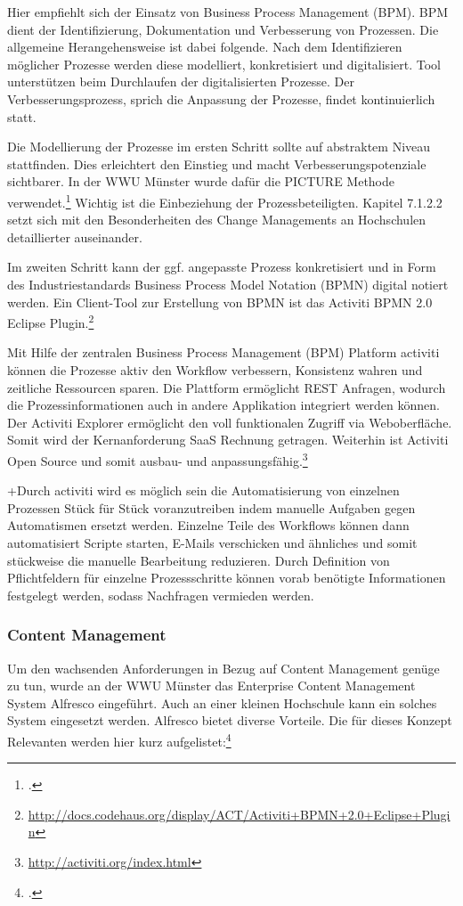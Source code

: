 {Hier empfiehlt sich der Einsatz von Business Process Management (BPM). BPM dient der Identifizierung, Dokumentation und Verbesserung von Prozessen. Die allgemeine Herangehensweise ist dabei folgende. Nach dem Identifizieren möglicher Prozesse werden diese modelliert, konkretisiert und digitalisiert. Tool unterstützen beim Durchlaufen der digitalisierten Prozesse. Der Verbesserungsprozess, sprich die Anpassung der Prozesse, findet kontinuierlich statt.

Die Modellierung der Prozesse im ersten Schritt sollte auf abstraktem Niveau stattfinden. Dies erleichtert den Einstieg und macht Verbesserungspotenziale sichtbarer. In der WWU Münster wurde dafür die PICTURE Methode verwendet.\footcite[Vgl.][16]{becker_prozesse_2010} Wichtig ist die Einbeziehung der Prozessbeteiligten. Kapitel 7.1.2.2 setzt sich mit den Besonderheiten des Change Managements an Hochschulen detaillierter auseinander.

Im zweiten Schritt kann der ggf. angepasste Prozess konkretisiert und in Form des Industriestandards Business Process Model Notation (BPMN) digital notiert werden. Ein Client-Tool zur Erstellung von BPMN ist das Activiti BPMN 2.0 Eclipse Plugin.\footnote{\url{http://docs.codehaus.org/display/ACT/Activiti+BPMN+2.0+Eclipse+Plugin}}

Mit Hilfe der zentralen Business Process Management (BPM) Platform activiti können die Prozesse aktiv den Workflow verbessern, Konsistenz wahren und zeitliche Ressourcen sparen.  Die Plattform ermöglicht REST Anfragen, wodurch die Prozessinformationen auch in andere Applikation integriert werden können. Der Activiti Explorer ermöglicht den voll funktionalen Zugriff via Weboberfläche. Somit wird der Kernanforderung SaaS Rechnung getragen. Weiterhin ist Activiti Open Source und somit ausbau- und anpassungsfähig.\footnote{\url{http://activiti.org/index.html}}

+Durch activiti wird es möglich sein die Automatisierung von einzelnen Prozessen Stück für Stück voranzutreiben indem manuelle Aufgaben gegen Automatismen ersetzt werden. Einzelne Teile des Workflows können dann automatisiert Scripte starten, E-Mails verschicken und ähnliches und somit stückweise die manuelle Bearbeitung reduzieren. Durch Definition von Pflichtfeldern für einzelne Prozessschritte können vorab benötigte Informationen festgelegt werden, sodass Nachfragen vermieden werden.

\subsubsection{Content Management}
Um den wachsenden Anforderungen in Bezug auf Content Management genüge zu tun, wurde an der WWU Münster das Enterprise Content Management System Alfresco eingeführt. Auch an einer kleinen Hochschule kann ein solches System eingesetzt werden. Alfresco bietet diverse Vorteile. Die für dieses Konzept Relevanten werden hier kurz aufgelistet:\footcite[Vgl.][47 ff.]{kloetgen_2012}

}
